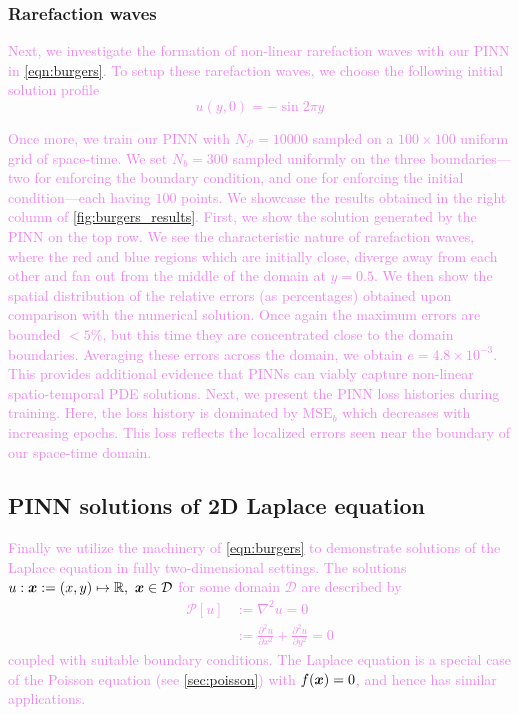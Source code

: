 \documentclass[11pt]{article}
\newcommand{\gv}[1]{\ensuremath{\mbox{\boldmath$ #1 $}}}
\newcommand{\mse}{\textrm{MSE}}
\newcommand{\pde}{\ensuremath{\mathcal{P}}}
\newcommand{\newcontent}[1]{\textcolor{violet}{#1}}
\begin{document}
\subsubsection{Rarefaction waves}
\label{sec:org6472f69}
\newcontent{
Next, we investigate the formation of non-linear rarefaction waves with our PINN in
\cref{eqn:burgers}. To setup these rarefaction waves, we choose the following
initial solution profile
\[ u(y, 0) = -\sin{2 \pi y}\]
}

\newcontent{
Once more, we train our PINN with \(N_\pde = 10000\) sampled on a \(100 \times 100\) uniform
grid of space-time. We set \(N_b = 300\) sampled uniformly on
the three boundaries---two for enforcing the boundary condition, and one for
enforcing the initial condition---each having \(100\) points. We showcase
the results obtained
in the right column of \cref{fig:burgers_results}. First, we show the
solution generated by the PINN on the top row. We see the
characteristic nature of rarefaction waves, where the red and blue regions
which are initially close, diverge away from each other and fan out
from the middle of the domain at \(y = 0.5\). We then show the spatial
distribution of the relative errors (as percentages) obtained upon
comparison with the numerical solution. Once again the maximum errors are
bounded \(< 5\%\), but this time they are concentrated close to
the domain boundaries. Averaging these errors across the domain, we obtain \(e = 4.8 \times 10^{-3}\).
This provides additional evidence that PINNs can viably capture non-linear
spatio-temporal PDE solutions. Next, we present the PINN loss histories
during training.
Here, the loss history is dominated by \(\mse_{b}\) which decreases with
increasing epochs. This loss reflects the localized errors seen near the
boundary of our space-time domain.
}

\subsection{PINN solutions of 2D Laplace equation}
\label{sec:laplace}
\newcontent{
Finally we utilize the machinery of \cref{eqn:burgers} to demonstrate solutions
of the Laplace equation in fully two-dimensional settings. The solutions \(u : \gv{x} := (x, y) \mapsto \mathbb{R},~\gv{x} \in \mathcal{D}\) for some domain \(\mathcal{D}\)
are described by
\begin{equation}
\label{eqn:laplace}
\begin{aligned}
	\pde[ u ] &:= \nabla^2 u = 0 \\
	   		  &:= \frac{\partial^2 u}{\partial x^2} + \frac{\partial^2 u}{\partial y^2} = 0
\end{aligned}
\end{equation}
coupled with suitable boundary conditions. The Laplace equation is a special
case of the Poisson equation (see \cref{sec:poisson}) with \(f(\gv{x}) = 0\),
and hence has similar applications.
}
\end{document}
